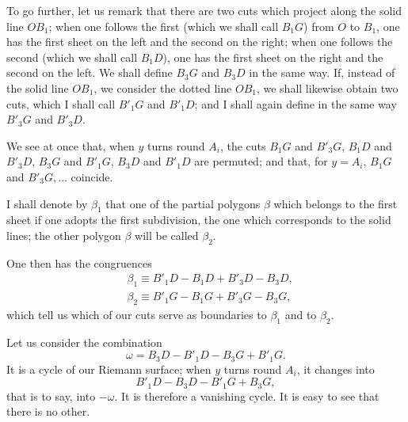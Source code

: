 \documentclass{article}
\begin{document}
To go further, let us remark that there are two cuts which project along the solid line $OB_{1}$; when one follows the first (which we shall call $B_{1}G$) from $O$ to $B_{1}$, one has the first sheet on the left and the second on the right; when one follows the second (which we shall call $B_{1}D$), one has the first sheet on the right and the second on the left. We shall define $B_{3}G$ and $B_{3}D$ in the same way. If, instead of the solid line $OB_{1}$, we consider the dotted line $OB_{1}$, we shall likewise obtain two cuts, which I shall call $B'_{1}G$ and $B'_{1}D$; and I shall again define in the same way $B'_{3}G$ and $B'_{3}D$.

We see at once that, when $y$ turns round $A_{i}$, the cuts $B_{1}G$ and $B'_{3}G$, $B_{1}D$ and $B'_{3}D$, $B_{3}G$ and $B'_{1}G$, $B_{3}D$ and $B'_{1}D$ are permuted; and that, for $y = A_{i}$, $B_{1}G$ and $B'_{3}G, \ldots$ coincide.

I shall denote by $\beta_{1}$ that one of the partial polygons $\beta$ which belongs to the first sheet if one adopts the first subdivision, the one which corresponds to the solid lines; the other polygon $\beta$ will be called $\beta_{2}$.

One then has the congruences
\[ \begin{aligned} &\beta_{1} \equiv B'_{1}D - B_{1}D + B'_{3}D - B_{3}D,\\ &\beta_{2} \equiv B'_{1}G - B_{1}G + B'_{3}G - B_{3}G, \end{aligned} \]
which tell us which of our cuts serve as boundaries to $\beta_{1}$ and to $\beta_{2}$.

Let us consider the combination
\[ \omega = B_{3}D - B'_{1}D - B_{3}G + B'_{1}G. \]
It is a cycle of our Riemann surface; when $y$ turns round $A_{i}$, it changes into
\[ B'_{1}D - B_{3}D - B'_{1}G + B_{3}G, \]
that is to say, into $-\omega$. It is therefore a vanishing cycle. It is easy to see that there is no other.

\end{document}

